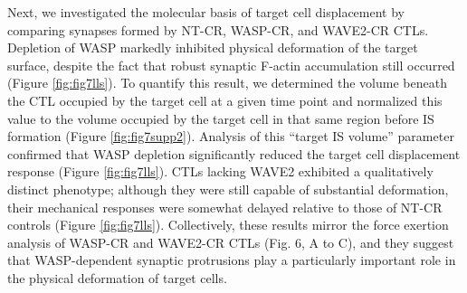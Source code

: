 Next, we investigated the molecular basis of target cell displacement by comparing synapses formed by NT-CR, WASP-CR, and WAVE2-CR CTLs. Depletion of WASP markedly inhibited physical deformation of the target surface, despite the fact that robust synaptic F-actin accumulation still occurred (Figure \ref{fig:fig7lls}). To quantify this result, we determined the volume beneath the CTL occupied by the target cell at a given time point and normalized this value to the volume occupied by the target cell in that same region before IS formation (Figure \ref{fig:fig7supp2}). Analysis of this “target IS volume” parameter confirmed that WASP depletion significantly reduced the target cell displacement response (Figure \ref{fig:fig7lls}). CTLs lacking WAVE2 exhibited a qualitatively distinct phenotype; although they were still capable of substantial deformation, their mechanical responses were somewhat delayed relative to those of NT-CR controls (Figure \ref{fig:fig7lls}). Collectively, these results mirror the force exertion analysis of WASP-CR and WAVE2-CR CTLs (Fig. 6, A to C), and they suggest that WASP-dependent synaptic protrusions play a particularly important role in the physical deformation of target cells.


